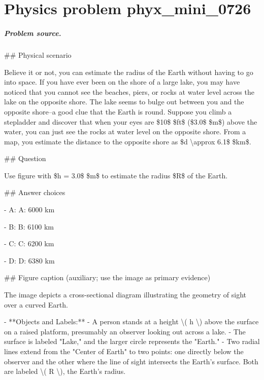 
\chapter{Physics problem phyx\_mini\_0726}
\label{ch:PhyXMiniProblems_problem_phyx_mini_0726}

\paragraph{Problem source.}
\#\# Physical scenario

Believe it or not, you can estimate the radius of the Earth without having to go into space. If you have ever been on the shore of a large lake, you may have noticed that you cannot see the beaches, piers, or rocks at water level across the lake on the opposite shore. The lake seems to bulge out between you and the opposite shore--a good clue that the Earth is round. Suppose you climb a stepladder and discover that when your eyes are \$10\$ \$ft\$ (\$3.0\$ \$m\$) above the water, you can just see the rocks at water level on the opposite shore. From a map, you estimate the distance to the opposite shore as \$d \textbackslash{}approx 6.1\$ \$km\$.

\#\# Question

Use figure with \$h = 3.0\$ \$m\$ to estimate the radius \$R\$ of the Earth.

\#\# Answer choices

- A: A: 6000 km

- B: B: 6100 km

- C: C: 6200 km

- D: D: 6380 km

\#\# Figure caption (auxiliary; use the image as primary evidence)

The image depicts a cross-sectional diagram illustrating the geometry of sight over a curved Earth. 

- **Objects and Labels:**
  - A person stands at a height \textbackslash{}( h \textbackslash{}) above the surface on a raised platform, presumably an observer looking out across a lake.
  - The surface is labeled "Lake," and the larger circle represents the "Earth."
  - Two radial lines extend from the "Center of Earth" to two points: one directly below the observer and the other where the line of sight intersects the Earth's surface. Both are labeled \textbackslash{}( R \textbackslash{}), the Earth's radius.
  
